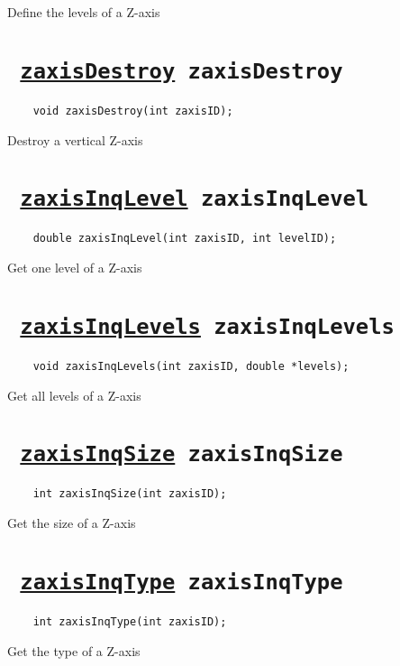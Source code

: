 Define the levels of a Z-axis
\ifpdfoutput{}{(\ref{zaxisDefLevels})}


\section*{\texttt{ 
\ifpdf
\hyperref[zaxisDestroy]{zaxisDestroy}
\else
zaxisDestroy
\fi
}}
\begin{verbatim}
    void zaxisDestroy(int zaxisID);
\end{verbatim}

Destroy a vertical Z-axis
\ifpdfoutput{}{(\ref{zaxisDestroy})}


\section*{\texttt{ 
\ifpdf
\hyperref[zaxisInqLevel]{zaxisInqLevel}
\else
zaxisInqLevel
\fi
}}
\begin{verbatim}
    double zaxisInqLevel(int zaxisID, int levelID);
\end{verbatim}

Get one level of a Z-axis
\ifpdfoutput{}{(\ref{zaxisInqLevel})}


\section*{\texttt{ 
\ifpdf
\hyperref[zaxisInqLevels]{zaxisInqLevels}
\else
zaxisInqLevels
\fi
}}
\begin{verbatim}
    void zaxisInqLevels(int zaxisID, double *levels);
\end{verbatim}

Get all levels of a Z-axis
\ifpdfoutput{}{(\ref{zaxisInqLevels})}


\section*{\texttt{ 
\ifpdf
\hyperref[zaxisInqSize]{zaxisInqSize}
\else
zaxisInqSize
\fi
}}
\begin{verbatim}
    int zaxisInqSize(int zaxisID);
\end{verbatim}

Get the size of a Z-axis
\ifpdfoutput{}{(\ref{zaxisInqSize})}


\section*{\texttt{ 
\ifpdf
\hyperref[zaxisInqType]{zaxisInqType}
\else
zaxisInqType
\fi
}}
\begin{verbatim}
    int zaxisInqType(int zaxisID);
\end{verbatim}

Get the type of a Z-axis
\ifpdfoutput{}{(\ref{zaxisInqType})}
